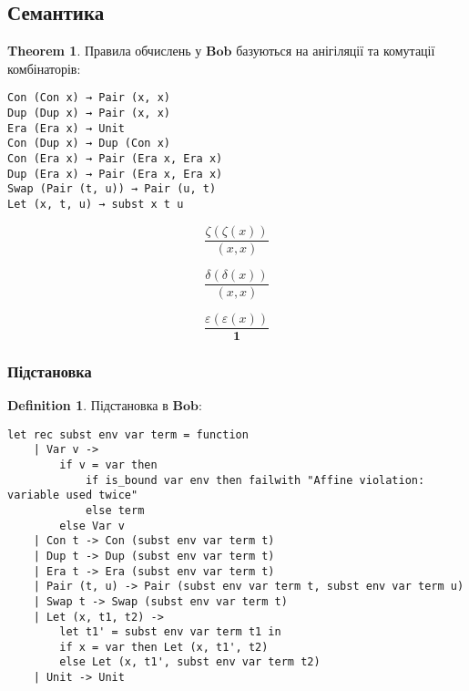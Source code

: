 \documentclass{article}
\theoremstyle{definition}
\newtheorem{theorem}{Theorem}
\newtheorem{definition}{Definition}
\begin{document}
\subsection{Семантика}

\begin{theorem}
Правила обчислень у $\mathbf{Bob}$ базуються на анігіляції та комутації комбінаторів:
\begin{lstlisting}[mathescape=true]
Con (Con x) → Pair (x, x)
Dup (Dup x) → Pair (x, x)
Era (Era x) → Unit
Con (Dup x) → Dup (Con x)
Con (Era x) → Pair (Era x, Era x)
Dup (Era x) → Pair (Era x, Era x)
Swap (Pair (t, u)) → Pair (u, t)
Let (x, t, u) → subst x t u
\end{lstlisting}
\end{theorem}

\begin{equation}
\tag{$\zeta$-annihilation}
\dfrac
{\zeta (\zeta (x))}
{(x, x)}
\end{equation}

\begin{equation}
\tag{$\delta$-annihilation}
\dfrac
{\delta (\delta (x))}
{(x, x)}
\end{equation}

\begin{equation}
\tag{$\epsilon$-annihilation}
\dfrac
{\varepsilon (\varepsilon (x))}
{\mathbf{1}}
\end{equation}

\subsubsection{Підстановка}

\begin{definition}
Підстановка в $\mathbf{Bob}$:
\begin{lstlisting}[mathescape=true]
let rec subst env var term = function
    | Var v ->
        if v = var then
            if is_bound var env then failwith "Affine violation: variable used twice"
            else term
        else Var v
    | Con t -> Con (subst env var term t)
    | Dup t -> Dup (subst env var term t)
    | Era t -> Era (subst env var term t)
    | Pair (t, u) -> Pair (subst env var term t, subst env var term u)
    | Swap t -> Swap (subst env var term t)
    | Let (x, t1, t2) ->
        let t1' = subst env var term t1 in
        if x = var then Let (x, t1', t2)
        else Let (x, t1', subst env var term t2)
    | Unit -> Unit
\end{lstlisting}
\end{definition}
\end{document}
